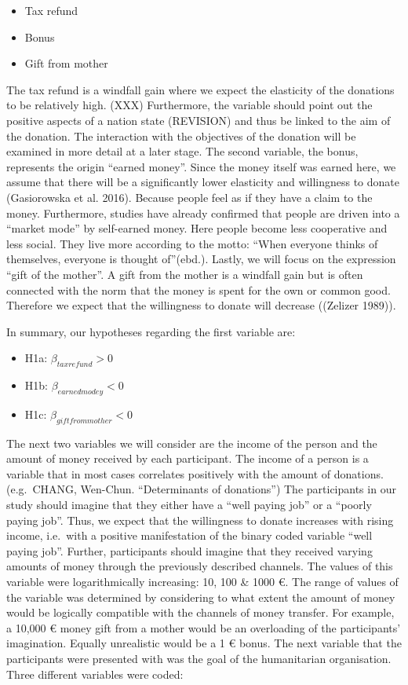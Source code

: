 \documentclass[
  12pt,
]{article}
\providecommand{\tightlist}{%
  \setlength{\itemsep}{0pt}\setlength{\parskip}{0pt}}
\begin{document}
\begin{itemize}
\tightlist
\item
  Tax refund
\item
  Bonus
\item
  Gift from mother
\end{itemize}

The tax refund is a windfall gain where we expect the elasticity of the
donations to be relatively high. (XXX) Furthermore, the variable should
point out the positive aspects of a nation state (REVISION) and thus be
linked to the aim of the donation. The interaction with the objectives
of the donation will be examined in more detail at a later stage. The
second variable, the bonus, represents the origin ``earned money''.
Since the money itself was earned here, we assume that there will be a
significantly lower elasticity and willingness to donate (Gasiorowska et
al. 2016). Because people feel as if they have a claim to the money.
Furthermore, studies have already confirmed that people are driven into
a ``market mode'' by self-earned money. Here people become less
cooperative and less social. They live more according to the motto:
``When everyone thinks of themselves, everyone is thought of''(ebd.).
Lastly, we will focus on the expression ``gift of the mother''. A gift
from the mother is a windfall gain but is often connected with the norm
that the money is spent for the own or common good. Therefore we expect
that the willingness to donate will decrease ((Zelizer 1989)).

In summary, our hypotheses regarding the first variable are:

\begin{itemize}
\tightlist
\item
  H1a: \(\beta_{taxrefund} > 0\)
\item
  H1b: \(\beta_{earnedmodey} < 0\)
\item
  H1c: \(\beta_{giftfrommother} < 0\)
\end{itemize}

The next two variables we will consider are the income of the person and
the amount of money received by each participant. The income of a person
is a variable that in most cases correlates positively with the amount
of donations. (e.g.~CHANG, Wen-Chun. ``Determinants of donations'') The
participants in our study should imagine that they either have a ``well
paying job'' or a ``poorly paying job''. Thus, we expect that the
willingness to donate increases with rising income, i.e.~with a positive
manifestation of the binary coded variable ``well paying job''. Further,
participants should imagine that they received varying amounts of money
through the previously described channels. The values of this variable
were logarithmically increasing: 10, 100 \& 1000 €. The range of values
of the variable was determined by considering to what extent the amount
of money would be logically compatible with the channels of money
transfer. For example, a 10,000 € money gift from a mother would be an
overloading of the participants' imagination. Equally unrealistic would
be a 1 € bonus. The next variable that the participants were presented
with was the goal of the humanitarian organisation. Three different
variables were coded:
\end{document}

